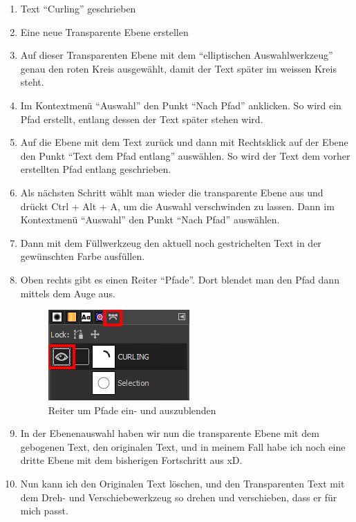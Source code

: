 \documentclass[11pt]{article}
\begin{document}
    \begin{enumerate}
        \item Text ``Curling'' geschrieben
        \item Eine neue Transparente Ebene erstellen
        \item Auf dieser Transparenten Ebene mit dem ``elliptischen Auswahlwerkzeug'' genau den roten Kreis ausgewählt,
        damit der Text später im weissen Kreis steht.
        \item Im Kontextmenü ``Auswahl'' den Punkt ``Nach Pfad'' anklicken. So wird ein Pfad erstellt, entlang dessen
        der Text später stehen wird.
        \item Auf die Ebene mit dem Text zurück und dann mit Rechtsklick auf der Ebene den Punkt ``Text dem Pfad entlang''
        auswählen. So wird der Text dem vorher erstellten Pfad entlang geschrieben.
        \item Als nächsten Schritt wählt man wieder die transparente Ebene aus und drückt Ctrl + Alt + A, um die Auswahl
        verschwinden zu lassen. Dann im Kontextmenü ``Auswahl'' den Punkt ``Nach Pfad'' auswählen.
        \item Dann mit dem Füllwerkzeug den aktuell noch gestrichelten Text in der gewünschten Farbe ausfüllen.
        \item Oben rechts gibt es einen Reiter ``Pfade''. Dort blendet man den Pfad dann mittels dem Auge aus.

        \begin{figure}[h]
            \centering
            \includegraphics{media/paths}
            \caption{Reiter um Pfade ein- und auszublenden}
        \end{figure}

        \item In der Ebenenauswahl haben wir nun die transparente Ebene mit dem gebogenen Text, den originalen Text,
        und in meinem Fall habe ich noch eine dritte Ebene mit dem bisherigen Fortschritt aus xD.
        \item Nun kann ich den Originalen Text löschen, und den Transparenten Text mit dem Dreh- und Verschiebewerkzeug
        so drehen und verschieben, dass er für mich passt.
    \end{enumerate}
\end{document}
